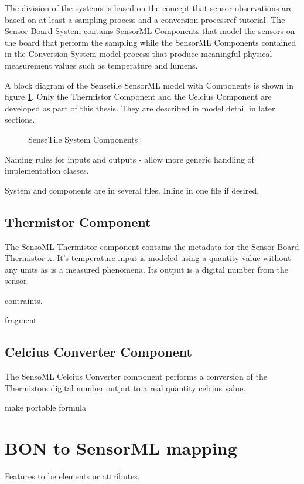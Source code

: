 \documentclass[]{final_report}
\begin{document}
The division of the systems is based on the concept that sensor observations are based on at least a sampling process and a conversion process{ref tutorial}. The Sensor Board System contains SensorML Components that model the sensors on the board that perform the sampling while the SensorML Components contained in the Conversion System model process that produce meaningful physical measurement values such as temperature and lumens.

A block diagram of the Sensetile SensorML model with Components is shown in figure \ref{fig:SensorML_SenseTile_System_comp}. Only the Thermistor Component and the Celcius Component are developed as part of this thesis. They are described in model detail in later sections.
\begin{figure}[h]
\caption{SenseTile System Components}\label{fig:SensorML_SenseTile_System_comp}
\end{figure}

Naming rules for inputs and outputs - allow more generic handling of implementation classes.

System and components are in several files. Inline in one file if desired.

\subsection{Thermistor Component}
The SensoML Thermistor component contains the metadata for the Sensor Board Thermistor x. It's temperature input is modeled using a quantity value without any units as is a measured phenomena. Its output is a digital number from the sensor.

contraints.

fragment
\subsection{Celcius Converter Component}

The SensoML Celcius Converter component performs a conversion of the Thermistors digital number output to a real quantity celcius value. 

make portable
formula

\newpage
\section{BON to SensorML mapping}
Features to be elements or attributes.
\end{document}
